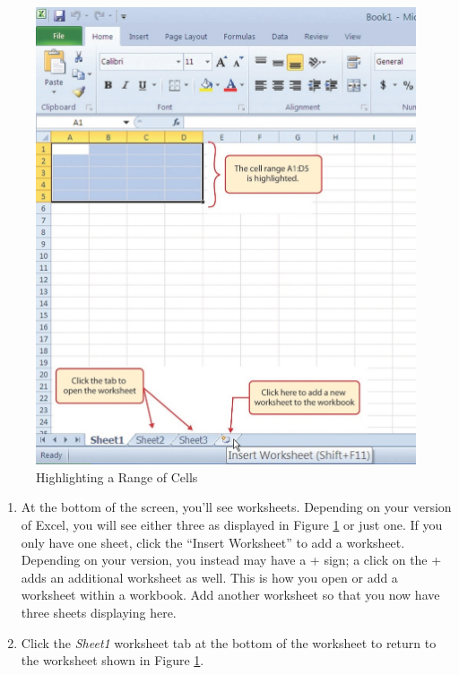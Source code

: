 \begin{figure}[H]
	\centering
	\includegraphics[width=\maxwidth{.95\linewidth}]{gfx/ch01_fig05}
	\caption{Highlighting a Range of Cells}
	\label{01:fig05}
\end{figure}

\begin{enumerate}
	\item At the bottom of the screen, you'll see worksheets. Depending on your version of Excel, you will see either three as displayed in Figure \ref{01:fig05} or just one. If you only have one sheet, click the ``Insert Worksheet'' to add a worksheet. Depending on your version, you instead may have a \textsf{+} sign; a click on the \textsf{+} adds an additional worksheet as well. This is how you open or add a worksheet within a workbook. Add another worksheet so that you now have three sheets displaying here.
	\item Click the \textit{Sheet1} worksheet tab at the bottom of the worksheet to return to the worksheet shown in Figure \ref{01:fig05}.
\end{enumerate}

